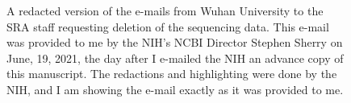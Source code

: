 \documentclass[9pt,twocolumn,twoside]{gsajnl_modified}
\begin{document}
\begin{figure}
\centerline{}
\caption{A redacted version of the e-mails from Wuhan University to the SRA staff requesting deletion of the sequencing data.
This e-mail was provided to me by the NIH's NCBI Director Stephen Sherry on June, 19, 2021, the day after I e-mailed the NIH an advance copy of this manuscript.
The redactions and highlighting were done by the NIH, and I am showing the e-mail exactly as it was provided to me.
}
\label{fig:SRA_email}
\end{figure}
\end{document}
